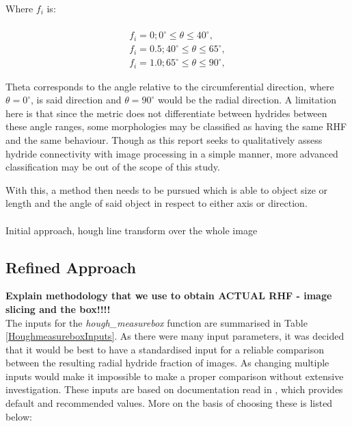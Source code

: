 \documentclass{article}
\begin{document}
    Where $f_i$ is:
    
    \begin{equation}
        \begin{aligned}
        \\
        f_i = 0;  0^{\circ} \leq \theta \leq 40^{\circ},\\
        
        f_i = 0.5;  40^{\circ} \leq \theta \leq 65^{\circ},\\
        
        f_i = 1.0; 65^{\circ} \leq \theta \leq 90^{\circ},
        \end{aligned}
    \end{equation}
    
    Theta corresponds to the angle relative to the circumferential direction, where $\theta = 0^{\circ}$, is said direction and $\theta = 90^{\circ}$ would be the radial direction. A limitation here is that since the metric does not differentiate between hydrides between these angle ranges, some morphologies may be classified as having the same RHF and the same behaviour. Though as this report seeks to qualitatively assess hydride connectivity with image processing in a simple manner, more advanced classification may be out of the scope of this study.
    
    With this, a method then needs to be pursued which is able to object size or length and the angle of said object in respect to either axis or direction. 
    \\
    \\
    Initial approach, hough line transform over the whole image


\subsection{Refined Approach}
\textbf{Explain methodology that we use to obtain ACTUAL RHF - image slicing and the box!!!!}\\

The inputs for the \textit{hough\_measurebox} function are summarised in Table \ref{HoughmeasureboxInputs}. As there were many input parameters, it was decided that it would be best to have a standardised input for a reliable comparison between the resulting radial hydride fraction of images. As changing multiple inputs would make it impossible to make a proper comparison without extensive investigation. These inputs are based on documentation read in \cite{ScikitimageB}, which provides default and recommended values. More on the basis of choosing these is listed below:
\end{document}
